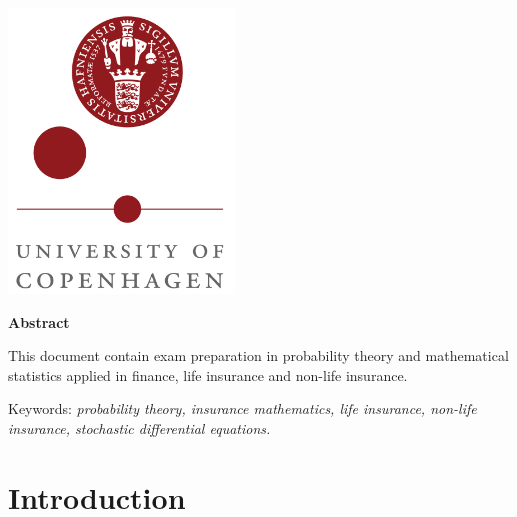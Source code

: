 \documentclass[
]{book}
\begin{document}
{\begin{titlepage}




\includegraphics[width = 0.45\textwidth]{logo_ku.png}%
 

\vfill %
\end{titlepage}

\thispagestyle{empty}
\begin{center}
\textbf{\large Abstract}
\end{center}

This document contain exam preparation in probability theory and mathematical statistics applied in finance, life insurance and non-life insurance.

Keywords: \emph{probability theory, insurance mathematics, life insurance,
non-life insurance, stochastic differential equations.}
\vfill
\pagebreak

\setcounter{tocdepth}{3}
\tableofcontents
}
\thispagestyle{empty}
\newpage
\setcounter{page}{1}
\pagestyle{fancy}
\fancyhf{}
\fancyhead[LE]{\fontsize{10}{12} \selectfont\nouppercase{\rightmark\hfill\leftmark}}
\fancyhead[RO]{\fontsize{10}{12} \selectfont\nouppercase{\leftmark\hfill\rightmark}}
\fancyfoot[LE,RO]{\hfill\thepage\hfill}
\hypertarget{introduction}{%
\chapter{Introduction}\label{introduction}}
\end{document}
